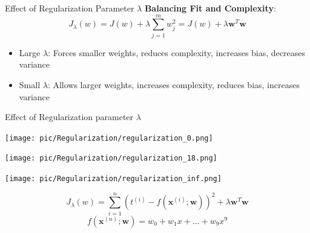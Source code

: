 \documentclass[serif, aspectratio=169]{beamer}
\begin{document}
    \begin{frame}{Effect of Regularization Parameter \( \lambda \)}
        \textbf{Balancing Fit and Complexity}:
        \[
            J_{\lambda}(w) = J(w) + \lambda \sum_{j=1}^{m} w_j^2 = J(w) + \lambda \mathbf{w}^T\mathbf{w}
        \]
        \begin{itemize}
            \item Large \( \lambda \): Forces smaller weights, reduces complexity, increases bias, decreases variance
            \item Small \( \lambda \): Allows larger weights, increases complexity, reduces bias, increases variance
        \end{itemize}
    \end{frame}

    \begin{frame}{Effect of Regularization parameter \( \lambda \)}
        \begin{minipage}{0.32\textwidth}
            \centering
            \texttt{[image: pic/Regularization/regularization\_0.png]}
        \end{minipage} %
        \begin{minipage}{0.32\textwidth}
            \centering
            \texttt{[image: pic/Regularization/regularization\_18.png]}
        \end{minipage} %
        \begin{minipage}{0.32\textwidth}
            \centering
            \texttt{[image: pic/Regularization/regularization\_inf.png]}
        \end{minipage}
        \vfill
        \[
            J_{\lambda}(w) = \sum_{i=1}^n \left( t^{(i)} - f(\mathbf{x}^{(i)}; \mathbf{w}) \right)^2 + \lambda \mathbf{w}^T\mathbf{w}
        \]
        \[
            f(\mathbf{x}^{(n)}; \mathbf{w}) = w_0 + w_1 x + \dots + w_9 x^9
        \]
        \vfill
    \end{frame}
\end{document}
